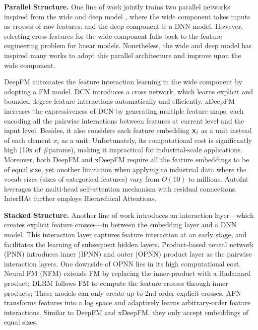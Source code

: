 \documentclass[sigconf]{acmart}
\newcommand{\vecx}{{\bf x}}
\begin{document}
{\bf Parallel Structure.} One line of work jointly trains two parallel networks inspired from
the wide and deep model \cite{cheng2016wide}, where the wide component takes inputs as crosses of raw features; and the deep component is a DNN model. However, selecting cross features for the wide component falls back to the feature engineering problem for linear models. Nonetheless, the wide and deep model has inspired many works to adopt this parallel architecture and improve upon the wide component. 

DeepFM \cite{guo2017deepfm} automates the feature interaction learning in the wide component by adopting a FM model. DCN \cite{wang2017deep} introduces a cross network, which learns explicit and bounded-degree feature interactions automatically and efficiently. xDeepFM \cite{lian2018xdeepfm} increases the expressiveness of DCN by generating multiple feature maps, each encoding all the pairwise interactions between features at current level and the input level. Besides, it also considers each feature embedding $\vecx_i$ as a unit instead of each element $x_i$ as a unit. Unfortunately, its computational cost is significantly high (10x of \#params), making it impractical for industrial-scale applications. Moreover, both DeepFM and xDeepFM require all the feature embeddings to be of equal size, yet another limitation when applying to industrial data where the vocab sizes (sizes of categorical features) vary from $O(10)$ to millions. AutoInt \cite{song2019autoint} leverages the multi-head self-attention mechanism with residual connections. InterHAt \cite{li2020interpretable} further employs Hierarchical Attentions.

{\bf Stacked Structure.} Another line of work introduces an interaction layer---which creates explicit feature crosses---in between the embedding layer and a DNN model. This interaction layer captures feature interaction at an early stage, and facilitates the learning of subsequent hidden layers. Product-based neural network (PNN) \cite{qu2016product} introduces inner (IPNN) and outer (OPNN) product layer as the pairwise interaction layers. One downside of OPNN lies in its high computational cost. Neural FM (NFM) \cite{he2017neural} extends FM by replacing the inner-product with a Hadamard product;
DLRM \cite{naumov2019deep} follows FM to compute the feature crosses through inner products;
These models can only create up to 2nd-order explicit crosses. AFN \cite{cheng2019adaptive} transforms features into a log space and adaptively learns arbitrary-order feature interactions. Similar to DeepFM and xDeepFM, they only accept embeddings of equal sizes.
\end{document}
